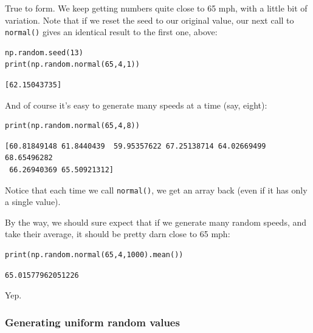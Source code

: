 True to form. We keep getting numbers quite close to 65 mph, with a little bit
of variation. Note that if we reset the seed to our original value, our next
call to \texttt{normal()} gives an identical result to the first one, above:

\begin{Verbatim}[fontsize=\small,samepage=true,frame=single,framesep=3mm]
np.random.seed(13)
print(np.random.normal(65,4,1))
\end{Verbatim}
\vspace{-.2in}

\begin{Verbatim}[fontsize=\small,samepage=true,frame=leftline,framesep=5mm,framerule=1mm]
[62.15043735]
\end{Verbatim}

And of course it's easy to generate many speeds at a time (say, eight):

\begin{Verbatim}[fontsize=\small,samepage=true,frame=single,framesep=3mm]
print(np.random.normal(65,4,8))
\end{Verbatim}
\vspace{-.2in}

\begin{Verbatim}[fontsize=\small,samepage=true,frame=leftline,framesep=5mm,framerule=1mm]
[60.81849148 61.8440439  59.95357622 67.25138714 64.02669499 68.65496282
 66.26940369 65.50921312]
\end{Verbatim}

Notice that each time we call \texttt{normal()}, we get an array back (even if
it has only a single value).

By the way, we should sure expect that if we generate many random speeds, and
take their average, it should be pretty darn close to 65 mph:

\begin{Verbatim}[fontsize=\small,samepage=true,frame=single,framesep=3mm]
print(np.random.normal(65,4,1000).mean())                        
\end{Verbatim}

\begin{Verbatim}[fontsize=\small,samepage=true,frame=leftline,framesep=5mm,framerule=1mm]
65.01577962051226
\end{Verbatim}

Yep.

\subsubsection{Generating uniform random values}

